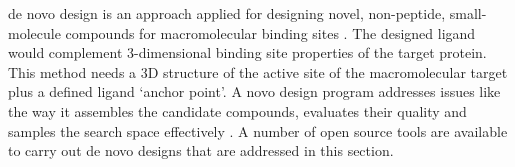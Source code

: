 de novo design is an approach applied for designing novel, non-peptide, small-molecule compounds for macromolecular binding sites \cite{Schneider_2005}. The designed ligand would complement 3-dimensional binding site properties of the target protein. This method needs a 3D structure of the active site of the macromolecular target plus a defined ligand `anchor point'. A novo design program addresses issues like the way it assembles the candidate compounds, evaluates their quality and samples the search space effectively \cite{Kawai_2014}. A number of open source tools are available to carry out de novo designs that are addressed in this section.